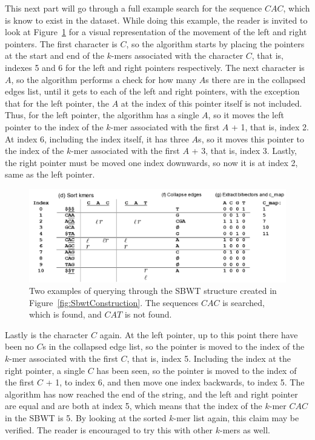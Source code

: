 This next part will go through a full example search for the sequence $\mathit{CAC}$, which is know to exist in the dataset.
While doing this example, the reader is invited to look at Figure~\ref{fig:IndexQueryExample} for a visual representation of the movement of the left and right pointers.
The first character is $C$, so the algorithm starts by placing the pointers at the start and end of the $k$-mers associated with the character $C$, that is, indexes 5 and 6 for the left and right pointers respectively.
The next character is $A$, so the algorithm performs a check for how many $A$s there are in the collapsed edges list, until it gets to each of the left and right pointers, with the exception that for the left pointer, the $A$ at the index of this pointer itself is not included.
Thus, for the left pointer, the algorithm has a single $A$, so it moves the left pointer to the index of the $k$-mer associated with the first $A$ + 1, that is, index 2.
At index 6, including the index itself, it has three $A$s, so it moves this pointer to the index of the $k$-mer associated with the first $A$ + 3, that is, index 3.
Lastly, the right pointer must be moved one index downwards, so now it is at index 2, same as the left pointer.

\begin{figure}[t]
  \centering
  \includegraphics[width=\textwidth]{images/IndexQueryExample.png}
  \caption{Two examples of querying through the SBWT structure created in Figure~\ref{fig:SbwtConstruction}. The sequences $CAC$ is searched, which is found, and $CAT$ is not found.}\label{fig:IndexQueryExample}
\end{figure}

Lastly is the character $C$ again.
At the left pointer, up to this point there have been no $C$s in the collapsed edge list, so the pointer is moved to the index of the $k$-mer associated with the first $C$, that is, index 5.
Including the index at the right pointer, a single $C$ has been seen, so the pointer is moved to the index of the first $C$ + 1, to index 6, and then move one index backwards, to index 5.
The algorithm has now reached the end of the string, and the left and right pointer are equal and are both at index 5, which means that the index of the $k$-mer $CAC$ in the SBWT is 5.
By looking at the sorted $k$-mer list again, this claim may be verified.
The reader is encouraged to try this with other $k$-mers as well.

